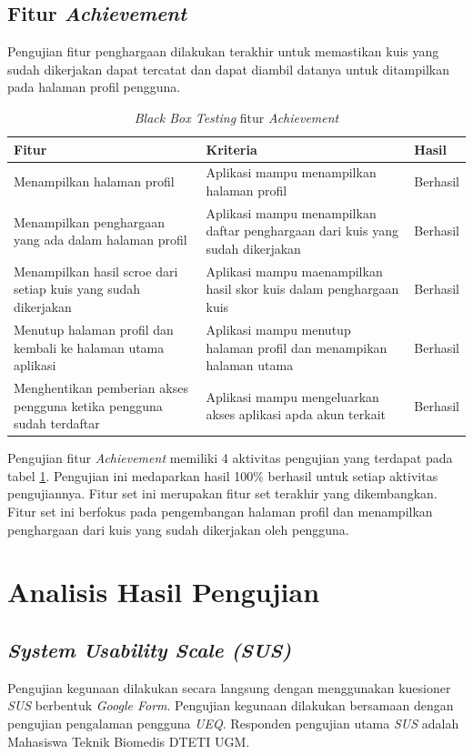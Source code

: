 \subsection{Fitur \textit{Achievement}}
Pengujian fitur penghargaan dilakukan terakhir untuk memastikan kuis yang sudah dikerjakan dapat tercatat dan dapat diambil datanya untuk ditampilkan pada halaman profil pengguna.
\begin{table}[H]
	\caption{\textit{Black Box Testing} fitur \textit{Achievement}}
	\label{Tab:blackBoxAchie}
	\begin{tabular}{|p{}|p{}|p{}|}
		\hline
		 \centering\textbf{Fitur} & \multicolumn{1}{m{0.45\textwidth}|}{\centering \textbf{Kriteria}}&  \multicolumn{1}{m{0.1\textwidth}|}{\centering \textbf{Hasil}}\\
		\hline
		Menampilkan halaman profil
		& Aplikasi mampu menampilkan halaman profil 
		& Berhasil\\
		\hline
		Menampilkan penghargaan yang ada dalam halaman profil
		& Aplikasi mampu menampilkan daftar penghargaan dari kuis yang sudah dikerjakan
		& Berhasil\\
		\hline
		Menampilkan hasil scroe dari setiap kuis yang sudah dikerjakan
		& Aplikasi mampu maenampilkan hasil skor kuis dalam penghargaan kuis
		& Berhasil\\
		\hline
		Menutup halaman profil dan kembali ke halaman utama aplikasi
		&Aplikasi mampu menutup halaman profil dan menampikan halaman utama
		& Berhasil\\
		\hline
		Menghentikan pemberian akses pengguna ketika pengguna sudah terdaftar
		& Aplikasi mampu mengeluarkan akses aplikasi apda akun terkait
		& Berhasil\\
		\hline
	\end{tabular}
\end{table}
Pengujian fitur \textit{Achievement} memiliki 4 aktivitas pengujian yang terdapat pada tabel \ref*{Tab:blackBoxAchie}.
Pengujian ini medaparkan hasil 100\% berhasil untuk setiap aktivitas pengujiannya. Fitur set ini merupakan fitur set terakhir yang dikembangkan.
Fitur set ini berfokus pada pengembangan halaman profil dan menampilkan penghargaan dari kuis yang sudah dikerjakan oleh pengguna.
\newpage
\section{Analisis Hasil Pengujian}
\subsection{\textit{System Usability Scale (SUS)}}
Pengujian kegunaan dilakukan secara langsung dengan menggunakan kuesioner \textit{SUS} berbentuk \textit{Google Form}.
Pengujian kegunaan dilakukan bersamaan dengan pengujian pengalaman pengguna \textit{UEQ}.
Responden pengujian utama \textit{SUS} adalah Mahasiswa Teknik Biomedis DTETI UGM. 

